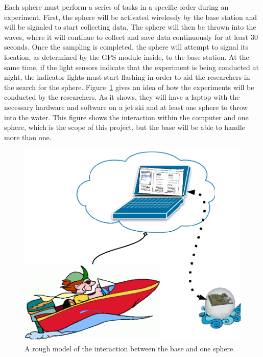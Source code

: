 Each sphere must perform a series of tasks in a specific order during an experiment.  First, the sphere will be activated wirelessly by the base station and will be signaled to start collecting data.  The sphere will then be thrown into the waves, where it will continue to collect and save data continuously for at least 30 seconds. Once the sampling is completed, the sphere will attempt to signal its location, as determined by the GPS module inside, to the base station.  At the same time, if the light sensors indicate that the experiment is being conducted at night, the indicator lights must start flashing in order to aid the researchers in the search for the sphere.  Figure~\ref{fig:GSV} gives an idea of how the experiments will be conducted by the researchers.  As it shows, they will have a laptop with the necessary hardware and software on a jet ski and at least one sphere to throw into the water.  This figure shows the interaction within the computer and one sphere, which is the scope of this project, but the base will be able to handle more than one.  

\begin{figure}[H]
	\centering
	\includegraphics[scale=0.6]{img/GSV1}
	\caption{A rough model of the interaction between the base and one sphere. \label{fig:GSV}}
\end{figure}

